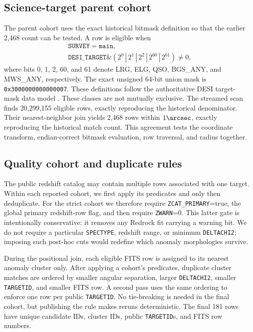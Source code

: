 \documentclass[twocolumn]{aastex701}
\begin{document}
\subsection{Science-target parent cohort}\label{sec:parent-selection}

The parent cohort uses the exact historical bitmask definition so that the earlier 2,468 count
can be tested.  A row is eligible when
\begin{equation}
\begin{split}
&\texttt{SURVEY}=\texttt{main},\\
&\texttt{DESI\_TARGET}\mathbin{\&}
\left(2^0\,|\,2^1\,|\,2^2\,|\,2^{60}\,|\,2^{61}\right)\ne0,
\end{split}
\end{equation}
where bits 0, 1, 2, 60, and 61 denote LRG, ELG, QSO, BGS\_ANY, and MWS\_ANY, respectively.
The exact unsigned 64-bit union mask is \texttt{0x3000000000000007}.
These definitions follow the authoritative DESI target-mask data model \citep{DESIBitmasks}.
These classes are not mutually exclusive.  The streamed scan finds 20,299,155 eligible rows,
exactly reproducing the historical denominator.  Their nearest-neighbor join yields 2,468 rows
within $1\arcsec$, exactly reproducing the historical match count.  This agreement tests the
coordinate transform, endian-correct bitmask evaluation, row traversal, and radius together.

\subsection{Quality cohort and duplicate rules}\label{sec:quality-selection}

The public redshift catalog may contain multiple rows associated with one target.  Within each
reported cohort, we first apply its predicates and only then deduplicate.  For the strict cohort
we therefore require \texttt{ZCAT\_PRIMARY}=true, the global primary redshift-row flag, and then
require
\texttt{ZWARN}=0.  This latter gate is intentionally conservative: it removes any Redrock fit
carrying a warning bit.  We do not require a particular \texttt{SPECTYPE}, redshift range, or
minimum \texttt{DELTACHI2}; imposing such post-hoc cuts would redefine which anomaly morphologies
survive.

During the positional join, each eligible FITS row is assigned to its nearest anomaly cluster
only.  After applying a cohort's predicates, duplicate cluster matches are ordered by smaller angular separation, larger
\texttt{DELTACHI2}, smaller \texttt{TARGETID}, and smaller FITS row.  A second pass uses the same
ordering to enforce one row per public \texttt{TARGETID}.  No tie-breaking is needed in the final
cohort, but publishing the rule makes reruns deterministic.  The final 181 rows have unique
candidate IDs, cluster IDs, public \texttt{TARGETID}s, and FITS row numbers.
\end{document}
